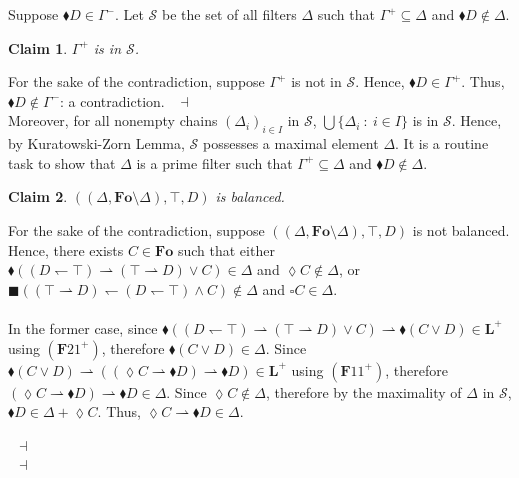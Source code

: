 \documentclass[draft]{article}
\newtheorem{claim}{Claim}
\newenvironment{proof}{{\bf Proof:}}{~$\dashv$\\}
\def\Formula{\mathbf{A}}
\def\Formula{\mathbf{F}}
\def\Fo{\mathbf{Fo}}
\def\L{\mathbf{L}}
\begin{document}
\begin{proof}
%
%
Suppose ${\blacklozenge}D{\in}\Gamma^{-}$.
Let ${\mathcal S}$ be the set of all filters $\Delta$ such that $\Gamma^{+}{\subseteq}\Delta$ and ${\blacklozenge}D{\not\in}\Delta$.
%
%
\begin{claim}
%
%
$\Gamma^{+}$ is in ${\mathcal S}$.
%
%
\end{claim}
%
%
\begin{proof}
%
%
For the sake of the contradiction, suppose $\Gamma^{+}$ is not in ${\mathcal S}$.
Hence, ${\blacklozenge}D{\in}\Gamma^{+}$.
Thus, ${\blacklozenge}D{\not\in}\Gamma^{-}$: a contradiction.
%
%
\medskip
%
%
\end{proof}
%
%
Moreover, for all nonempty chains $(\Delta_{i})_{i{\in}I}$ in ${\mathcal S}$, $\bigcup\{\Delta_{i}\ :\ i{\in}I\}$ is in ${\mathcal S}$.
Hence, by Kuratowski-Zorn Lemma, ${\mathcal S}$ possesses a maximal element $\Delta$.
It is a routine task to show that $\Delta$ is a prime filter such that $\Gamma^{+}{\subseteq}\Delta$ and ${\blacklozenge}D{\not\in}\Delta$.
%
%
\begin{claim}
%
%
$((\Delta,\Fo{\setminus}\Delta),{\top},D)$ is balanced.
%
%
\end{claim}
%
%
\begin{proof}
%
%
For the sake of the contradiction, suppose $((\Delta,\Fo{\setminus}\Delta),{\top},D)$ is not balanced.
Hence, there exists $C{\in}\Fo$ such that either ${\blacklozenge}((D{\leftharpoondown}{\top}){\rightharpoonup}({\top}{\rightharpoonup}D){\vee}C){\in}\Delta$ and ${\lozenge}C{\not\in}\Delta$, or ${\blacksquare}(({\top}{\rightharpoonup}D){\leftharpoondown}(D{\leftharpoondown}{\top}){\wedge}C){\not\in}\Delta$ and ${\square}C{\in}\Delta$.
%
%
\\
\\
%
%
In the former case, since ${\blacklozenge}((D{\leftharpoondown}{\top}){\rightharpoonup}({\top}{\rightharpoonup}D){\vee}C){\rightharpoonup}{\blacklozenge}(C{\vee}D){\in}\L^{+}$ using $(\Formula21^{+})$, therefore ${\blacklozenge}(C{\vee}D){\in}\Delta$.
Since ${\blacklozenge}(C{\vee}D){\rightharpoonup}(({\lozenge}C{\rightharpoonup}{\blacklozenge}D){\rightharpoonup}{\blacklozenge}D){\in}\L^{+}$ using $(\Formula11^{+})$,
%
%
%
%
%
%
%
\linebreak
%
%
%
%
%
%
therefore $({\lozenge}C{\rightharpoonup}{\blacklozenge}D){\rightharpoonup}{\blacklozenge}D{\in}\Delta$.
Since ${\lozenge}C{\not\in}\Delta$, therefore by the maximality of $\Delta$ in ${\mathcal S}$, ${\blacklozenge}D{\in}\Delta{+}{\lozenge}C$.
Thus, ${\lozenge}C{\rightharpoonup}{\blacklozenge}D{\in}\Delta$.

\end{proof}
\end{proof}
\end{document}
